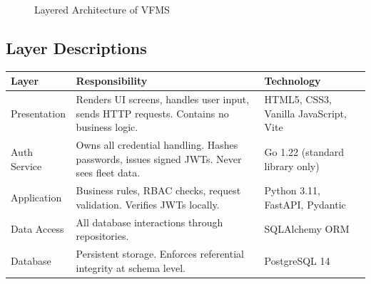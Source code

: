 \documentclass[11pt,a4paper]{article}
\begin{document}
\begin{figure}[H]
\centering
{}
\caption{Layered Architecture of VFMS}
\label{fig:architecture}
\end{figure}

\subsection{Layer Descriptions}

\begin{table}[H]
\centering
\begin{tabularx}{\textwidth}{|p{3cm}|p{6cm}|p{4cm}|}
\hline
\textbf{Layer} & \textbf{Responsibility} & \textbf{Technology} \\
\hline
Presentation & Renders UI screens, handles user input, sends HTTP requests. Contains no business logic. & HTML5, CSS3, Vanilla JavaScript, Vite \\
\hline
Auth Service & Owns all credential handling. Hashes passwords, issues signed JWTs. Never sees fleet data. & Go 1.22 (standard library only) \\
\hline
Application & Business rules, RBAC checks, request validation. Verifies JWTs locally. & Python 3.11, FastAPI, Pydantic \\
\hline
Data Access & All database interactions through repositories. & SQLAlchemy ORM \\
\hline
Database & Persistent storage. Enforces referential integrity at schema level. & PostgreSQL 14 \\
\hline
\end{tabularx}
\end{table}
\end{document}
